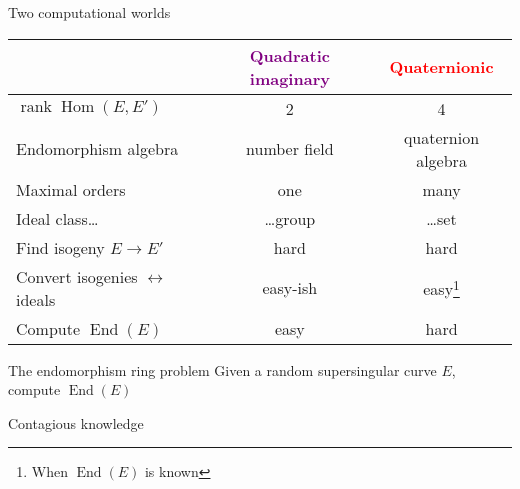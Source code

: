 \documentclass[aspectratio=169]{beamer}
\newcommand{\End}{\operatorname{End}}
\newcommand{\Hom}{\operatorname{Hom}}
\DeclareMathOperator{\rank}{rank}
\begin{document}
\begin{frame}{Two computational worlds}
  \centering
  \setlength{\tabcolsep}{2em}
  \renewcommand{\arraystretch}{1.5}
  \begin{tabular}{p{} c c}
    & \textcolor{purple}{Quadratic imaginary} & \textcolor{red}{Quaternionic}\\
    \hline
    $\rank\Hom(E,E')$ & 2 & 4\\
    Endomorphism algebra & number field & quaternion algebra\\
    Maximal orders & one & many \\
    Ideal class\dots & \dots group & \dots set\\
    Find isogeny $E → E'$ & \alert{hard} & \alert{hard}\\
    Convert isogenies $\leftrightarrow$ ideals & easy-ish\footnotemark[1] & easy\footnote[1]{When $\End(E)$ is known}\\
    Compute $\End(E)$ & easy & \alert{hard}\\
  \end{tabular}
\end{frame}


\begin{frame}{The endomorphism ring problem}
  \Large\centering
  \vfill
  Given a random supersingular curve $E$, compute $\End(E)$
  \vfill
\end{frame}


\begin{frame}{Contagious knowledge}
  \centering
\end{frame}
\end{document}
